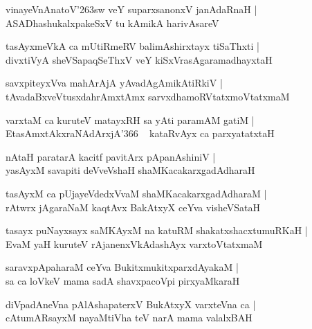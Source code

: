 \documentclass[twoside,12pt,openright]{book}
\def\S{\char'263}
\newcounter{shloka}[chapter]
\begin{document}
\begin{shloka}%
vinayeVnAnatoV\S sw veY suparxsanonxV janAdaRnaH |\\
ASADhashukalxpakeSxV tu kAmikA harivAsareV
\end{shloka}

\begin{shloka}%
tasAyxmeVkA ca mUtiRmeRV balimAshirxtayx tiSaThxti |\\
divxtiVyA sheVSapaqSeThxV veY kiSxVrasAgaramadhayxtaH 
\end{shloka}

\begin{shloka}%
savxpiteyxVva mahArAjA yAvadAgAmikAtiRkiV |\\
tAvadaBxveVtusxdahrAmxtAmx sarvxdhamoRVtatxmoVtatxmaM
\end{shloka}

\begin{shloka}%
varxtaM ca kuruteV matayxRH sa yAti paramAM gatiM |\\
EtasAmxtAkxraNAdArxjA\char'366 ~ kataRvAyx ca parxyatatxtaH 
\end{shloka}

\begin{shloka}%
nAtaH paratarA kacitf pavitArx pApanAshiniV |\\
yasAyxM savapiti deVveVshaH shaMKacakarxgadAdharaH 
\end{shloka}

\begin{shloka}%
tasAyxM ca pUjayeVdedxVvaM shaMKacakarxgadAdharaM |\\
rAtwrx jAgaraNaM kaqtAvx BakAtxyX ceYva visheVSataH
\end{shloka}

\begin{shloka}%
tasayx puNayxsayx saMKAyxM na katuRM shakatxshacxtumuRKaH |\\
EvaM yaH kuruteV rAjanenxVkAdashAyx varxtoVtatxmaM
\end{shloka}

\begin{shloka}%
saravxpApaharaM ceYva BukitxmukitxparxdAyakaM |\\
sa ca loVkeV mama sadA shavxpacoVpi pirxyaMkaraH
\end{shloka}

\begin{shloka}%
diVpadAneVna pAlAshapaterxV BukAtxyX varxteVna ca |\\
cAtumARsayxM nayaMtiVha teV narA mama valalxBAH
\end{shloka}
\end{document}
